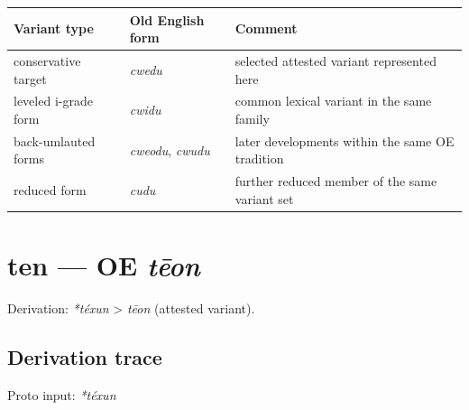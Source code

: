 \documentclass[
  british,
  a4paper,
  openany]{book}
\newcounter{none} %
\providecommand{\texorpdfstring}[2]{#1}
\begin{document}
{\def\LTcaptype{none} %
\begin{longtable}[]{@{}
  >{\raggedright\arraybackslash}p{}
  >{\raggedright\arraybackslash}p{}
  >{\raggedright\arraybackslash}p{}@{}}
\toprule\noalign{}
\begin{minipage}[b]{\linewidth}\raggedright
Variant type
\end{minipage} & \begin{minipage}[b]{\linewidth}\raggedright
Old English form
\end{minipage} & \begin{minipage}[b]{\linewidth}\raggedright
Comment
\end{minipage} \\
\midrule\noalign{}
\endhead
\bottomrule\noalign{}
\endlastfoot
conservative target & {\emph{cwedu}} & selected attested variant
represented here \\
leveled i-grade form & {\emph{cwidu}} & common lexical variant in the
same family \\
back-umlauted forms & {\emph{cweodu}}, {\emph{cwudu}} & later
developments within the same OE tradition \\
reduced form & {\emph{cudu}} & further reduced member of the same
variant set \\
\end{longtable}
}

\section{\texorpdfstring{ten --- OE
\emph{tēon}}{ten --- OE tēon}}\label{ten-oe-tux113on}


Derivation: \emph{*téxun} \textgreater{} \emph{tēon} (attested variant).

\subsection{Derivation trace}\label{derivation-trace-71}

Proto input: \emph{*téxun}

\begingroup
\setlength{\fboxsep}{6pt}
\end{document}
